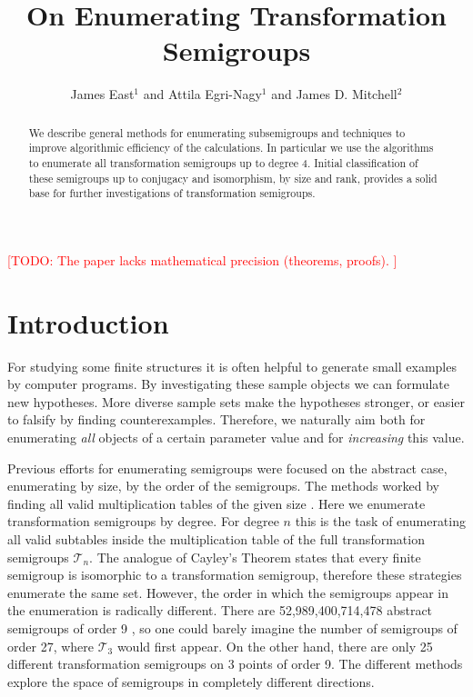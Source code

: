 \documentclass{amsart}
\newcommand{\cT}{{\mathcal T}}
\newcommand{\todo}[1]{\textcolor{red}{ \small \textsf{[TODO:  #1 ]} \normalsize}}
\theoremstyle{plain}
\theoremstyle{definition}
\begin{document}
\title{On Enumerating Transformation Semigroups}
\author{James East$^1$ and Attila Egri-Nagy$^{1}$ and James D. Mitchell$^2$}
\address{$^1$Centre for Research in Mathematics, School of Computing, Engineering and Mathematics, University of Western Sydney (Parramatta Campus), Locked Bag 1797, Penrith, NSW 2751, Australia}
\address{$^2$ Mathematical Institute, University of St Andrews, North Haugh, St Andrews, Fife, KY16 9SS, Scotland}
\todo{The paper lacks mathematical precision (theorems, proofs).}
\maketitle
\begin{abstract}
We describe general methods for enumerating subsemigroups and techniques to improve algorithmic efficiency of the calculations.
In particular we use the algorithms to enumerate all transformation semigroups up to degree 4.
Initial classification of these semigroups up to conjugacy and isomorphism, by size and rank, provides a solid base for further investigations of transformation semigroups.
\end{abstract}
\tableofcontents
\section{Introduction}
For studying some finite structures  it is often helpful to generate small examples by computer programs.
By investigating these sample objects we can formulate new hypotheses.
More diverse sample sets make the hypotheses stronger, or easier to falsify by finding counterexamples.
Therefore, we naturally aim both for enumerating \emph{all} objects of a certain parameter value and for \emph{increasing} this value.

Previous efforts for enumerating semigroups were focused on the abstract case, enumerating by size, by the order of the semigroups.
The methods worked by finding all valid multiplication tables of the given size \cite{monoidenum2009,For55,JW77,KRS76,Ple67,SZT94,tamura2,tamura1}.
Here we enumerate transformation semigroups by degree.
For degree $n$ this is the task of enumerating all valid subtables inside the multiplication table of the  full transformation semigroups $\cT_n$.
The analogue of Cayley's Theorem states that every finite semigroup is isomorphic to a transformation semigroup, therefore these strategies enumerate the same set.
However, the order in which the semigroups appear in the enumeration is radically different.
There are 52,989,400,714,478 abstract semigroups of order 9 \cite{monoidenum2009}, so one could barely imagine the number of semigroups of order 27, where $\cT_3$ would first appear.
On the other hand, there are only 25 different transformation semigroups on 3 points of order 9.
The different methods explore the space of semigroups in completely different directions.
\end{document}
